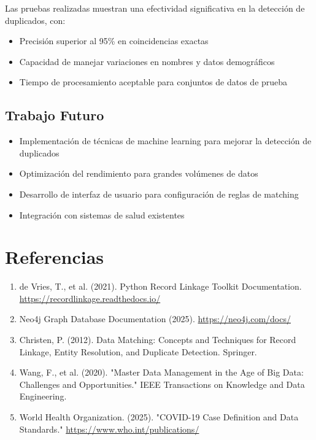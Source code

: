\documentclass[12pt]{article}
\begin{document}
Las pruebas realizadas muestran una efectividad significativa en la detección de duplicados, con:
\begin{itemize}
    \item Precisión superior al 95\% en coincidencias exactas
    \item Capacidad de manejar variaciones en nombres y datos demográficos
    \item Tiempo de procesamiento aceptable para conjuntos de datos de prueba
\end{itemize}

\subsection*{Trabajo Futuro}
\begin{itemize}
    \item Implementación de técnicas de machine learning para mejorar la detección de duplicados
    \item Optimización del rendimiento para grandes volúmenes de datos
    \item Desarrollo de interfaz de usuario para configuración de reglas de matching
    \item Integración con sistemas de salud existentes
\end{itemize}

\section{Referencias}
\label{sec:referencias}

\begin{enumerate}
    \item de Vries, T., et al. (2021). Python Record Linkage Toolkit Documentation. 
          \url{https://recordlinkage.readthedocs.io/}
    
    \item Neo4j Graph Database Documentation (2025). 
          \url{https://neo4j.com/docs/}
    
    \item Christen, P. (2012). Data Matching: Concepts and Techniques for Record Linkage, 
          Entity Resolution, and Duplicate Detection. Springer.
    
    \item Wang, F., et al. (2020). "Master Data Management in the Age of Big Data: 
          Challenges and Opportunities." IEEE Transactions on Knowledge and Data Engineering.
          
    \item World Health Organization. (2025). "COVID-19 Case Definition and Data Standards."
          \url{https://www.who.int/publications/}
\end{enumerate}
\end{document}
